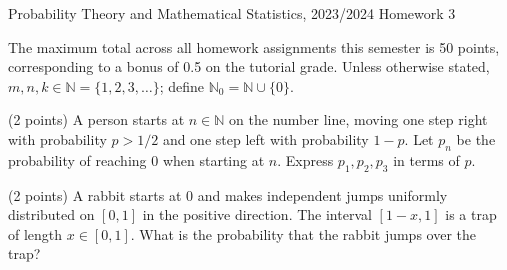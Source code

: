 \documentclass[a4paper]{report}
\begin{document}
\noindent Probability Theory and Mathematical Statistics, 2023/2024 \hfill Homework 3
\hrulefill
\begin{it}The maximum total across all homework assignments this semester is 50 points, corresponding to a bonus of 0.5 on the tutorial grade. Unless otherwise stated, $m,n,k\in\mathbb N=\{1,2,3,\ldots\}$; define $\mathbb N_0=\mathbb N\cup\{0\}$.\end{it}
\begin{problem} (2 points)
A person starts at $n\in\mathbb N$ on the number line, moving one step right with probability $p>1/2$ and one step left with probability $1-p$. Let $p_n$ be the probability of reaching 0 when starting at $n$. Express $p_1,p_2,p_3$ in terms of $p$.
\end{problem}

\begin{problem} (2 points)
A rabbit starts at 0 and makes independent jumps uniformly distributed on $[0,1]$ in the positive direction. The interval $[1-x,1]$ is a trap of length $x\in[0,1]$. What is the probability that the rabbit jumps over the trap?
\end{problem}
\end{document}
